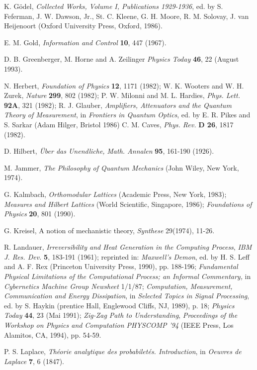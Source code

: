 \begin{thebibliography}{99}
 K. G\"odel, {\sl Collected Works, Volume I, Publications 1929-1936},
 ed. by S. Feferman, J. W. Dawson, Jr., St. C. Kleene, G. H. Moore, R.
 M. Solovay, J. van Heijenoort (Oxford University Press, Oxford, 1986).

 E. M. Gold, {\sl Information and Control} {\bf 10}, 447 (1967).

 D. B. Greenberger, M. Horne and A. Zeilinger
{\sl Physics Today} {\bf 46}, 22 (August 1993).


N. Herbert, {\sl Foundation of Physics} {\bf 12}, 1171 (1982);
W. K. Wooters and W. H. Zurek,
{\sl Nature} {\bf 299}, 802 (1982);
P. W. Milonni and M. L. Hardies,
{\sl Phys. Lett.} {\bf 92A}, 321 (1982);
 R. J. Glauber, {\sl Amplifiers, Attenuators and the Quantum Theory of
 Measurement}, in {\sl Frontiers in Quantum Optics}, ed. by E. R. Pikes
 and S. Sarkar (Adam Hilger, Bristol 1986)
C. M. Caves, {\sl Phys. Rev.} {\bf D 26}, 1817 (1982).

D. Hilbert,
{\sl \"Uber das Unendliche,}
{\sl Math. Annalen} {\bf 95}, 161-190 (1926).

M. Jammer,
{\sl The Philosophy of Quantum Mechanics} (John Wiley, New York, 1974).


 G. Kalmbach, {\sl Orthomodular Lattices} (Academic Press, New York,
 1983);
 {\sl Measures and Hilbert Lattices} (World Scientific,
Singapore, 1986);
{\sl Foundations of Physics} {\bf 20}, 801 (1990).

G. Kreisel, A notion of mechanistic theory, {\it Synthese} 29(1974),
11-26.


R. Landauer,
{\it Irreversibility and Heat Generation in the Computing Process},
{\sl IBM J. Res. Dev.} {\bf 5}, 183-191 (1961);
reprinted in: {\sl Maxwell's Demon}, ed. by H. S. Leff and A. F. Rex
(Princeton University Press, 1990), pp. 188-196;
{\sl Fundamental Physical Limitations of the Computational Process; an
Informal Commentary,} in
{\sl Cybernetics Machine Group Newsheet} 1/1/87;
{\it Computation, Measurement, Communication and Energy Dissipation}, in
{\sl Selected Topics in Signal Processing}, ed. by S. Haykin (prentice
Hall, Englewood Cliffs, NJ, 1989), p. 18;
{\sl Physics Today} {\bf 44}, 23 (Mai 1991);
{\it Zig-Zag Path to Understanding},
{\sl Proceedings of the Workshop on Physics and Computation PHYSCOMP
'94} (IEEE Press, Los Alamitos, CA, 1994), pp. 54-59.


P. S. Laplace,
{\sl Th\'{e}orie analytique des probabilet\'{e}s. Introduction}, in
{\sl Oeuvres de Laplace} {\bf 7}, 6 (1847).


\end{thebibliography}
